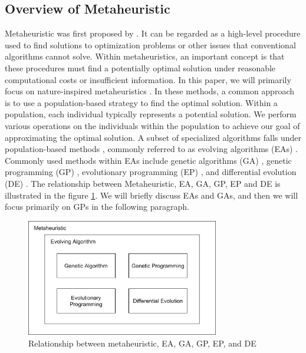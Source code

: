 \begin{ZhChapter}
    \subsection{Overview of Metaheuristic}
    Metaheuristic \cite{glover1986future} was first proposed by \citeauthor{glover1986future}. It can be regarded as a high-level procedure used to find solutions to optimization problems or other issues that conventional algorithms cannot solve. Within metaheuristics, an important concept is that these procedures must find a potentially optimal solution under reasonable computational costs or insufficient information. In this paper, we will primarily focus on nature-inspired metaheuristics \cite{yang2010nature}. In these methods, a common approach is to use a population-based strategy to find the optimal solution. Within a population, each individual typically represents a potential solution. We perform various operations on the individuals within the population to achieve our goal of approximating the optimal solution. A subset of specialized algorithms falls under population-based methods \cite{enwiki:1255593755}, commonly referred to as evolving algorithms (EAs) \cite{muhlenbein1988evolution}. Commonly used methods within EAs include genetic algorithms (GA) \cite{kumar2010genetic}, genetic programming (GP) \cite{geneticProgramming} , evolutionary programming (EP) \cite{yao1999evolutionary}, and differential evolution (DE) \cite{das2010differential}. The relationship between Metaheuristic, EA, GA, GP, EP and DE is illustrated in the figure \ref{fig: relationshipMap}. We will briefly discuss EAs and GAs, and then we will focus primarily on GPs in the following paragraph.
    \begin{figure}[htbp]
        \centering
        \includegraphics[width = 0.75\textwidth]{image/metaheuristic.png}
        \caption{Relationship between metaheuristic, EA, GA, GP, EP, and DE}
        \label{fig: relationshipMap}
    \end{figure}

\end{ZhChapter}

